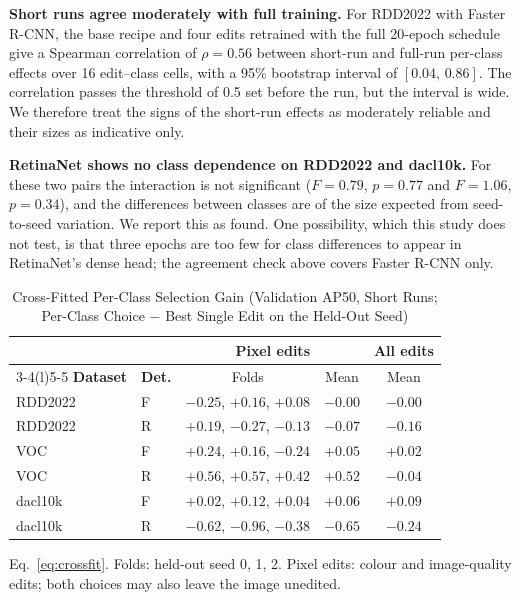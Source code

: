 \documentclass[conference]{IEEEtran}
\begin{document}
\noindent\textbf{Short runs agree moderately with full training.} For RDD2022 with Faster R-CNN, the base recipe and four edits retrained with the full 20-epoch schedule give a Spearman correlation of $\rho=0.56$ between short-run and full-run per-class effects over 16 edit--class cells, with a 95\% bootstrap interval of $[0.04,\,0.86]$. The correlation passes the threshold of 0.5 set before the run, but the interval is wide. We therefore treat the signs of the short-run effects as moderately reliable and their sizes as indicative only.

\noindent\textbf{RetinaNet shows no class dependence on RDD2022 and dacl10k.} For these two pairs the interaction is not significant ($F=0.79$, $p=0.77$ and $F=1.06$, $p=0.34$), and the differences between classes are of the size expected from seed-to-seed variation. We report this as found. One possibility, which this study does not test, is that three epochs are too few for class differences to appear in RetinaNet's dense head; the agreement check above covers Faster R-CNN only.

\begin{table}[t]
\caption{Cross-Fitted Per-Class Selection Gain (Validation AP50, Short Runs; Per-Class Choice $-$ Best Single Edit on the Held-Out Seed)}
\label{tab:crossfit}
\centering
\footnotesize
\setlength{\tabcolsep}{3pt}
\begin{tabular}{@{}llccc@{}}
\toprule
 & & \multicolumn{2}{c}{\textbf{Pixel edits}} & \textbf{All edits} \\
\cmidrule(lr){3-4}\cmidrule(l){5-5}
\textbf{Dataset} & \textbf{Det.} & Folds & Mean & Mean \\
\midrule
RDD2022 & F & $-0.25$, $+0.16$, $+0.08$ & $-0.00$ & $-0.00$ \\
RDD2022 & R & $+0.19$, $-0.27$, $-0.13$ & $-0.07$ & $-0.16$ \\
VOC & F & $+0.24$, $+0.16$, $-0.24$ & $+0.05$ & $+0.02$ \\
VOC & R & $+0.56$, $+0.57$, $+0.42$ & $+0.52$ & $-0.04$ \\
dacl10k & F & $+0.02$, $+0.12$, $+0.04$ & $+0.06$ & $+0.09$ \\
dacl10k & R & $-0.62$, $-0.96$, $-0.38$ & $-0.65$ & $-0.24$ \\
\bottomrule
\end{tabular}
\vspace{2pt}

\parbox{\columnwidth}{\footnotesize Eq.~\eqref{eq:crossfit}. Folds: held-out seed 0, 1, 2. Pixel edits: colour and image-quality edits; both choices may also leave the image unedited.}
\end{table}
\end{document}
